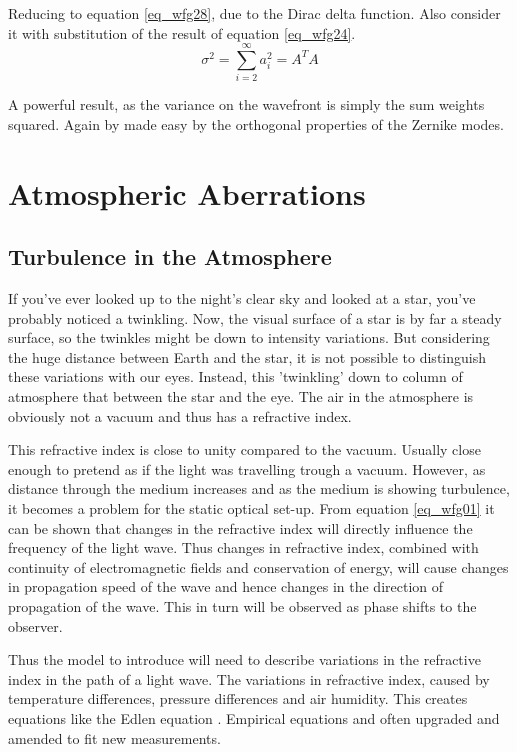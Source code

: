 \documentclass{article}
\begin{document}
Reducing to equation \ref{eq_wfg28}, due to the Dirac delta function. Also consider it with substitution of the result of equation \ref{eq_wfg24}.
\begin{equation}
\sigma^2 = \sum \limits_{i=2}^{\infty} a_i^2 = A^T A
\label{eq_wfg28}
\end{equation}

A powerful result, as the variance on the wavefront is simply the sum weights squared. Again by made easy by the orthogonal properties of the Zernike modes.

\newpage
\section{Atmospheric Aberrations}
\subsection{Turbulence in the Atmosphere}
If you've ever looked up to the night's clear sky and looked at a star, you've probably noticed a twinkling. Now, the visual surface of a star is by far a steady surface, so the twinkles might be down to intensity variations. But considering the huge distance between Earth and the star, it is not possible to distinguish these variations with our eyes. Instead, this 'twinkling' down to column of atmosphere that between the star and the eye. The air in the atmosphere is obviously not a vacuum and thus has a refractive index. 

This refractive index is close to unity compared to the vacuum. Usually close enough to pretend as if the light was travelling trough a vacuum. However, as distance through the medium increases and as the medium is showing turbulence, it becomes a problem for the static optical set-up. From equation \ref{eq_wfg01} it can be shown that changes in the refractive index will directly influence the frequency of the light wave. Thus changes in refractive index, combined with continuity of electromagnetic fields and conservation of energy, will cause changes in propagation speed of the wave and hence changes in the direction of propagation of the wave. This in turn will be observed as phase shifts to the observer.

Thus the model to introduce will need to describe variations in the refractive index in the path of a light wave. The variations in refractive index, caused by temperature differences, pressure differences and air humidity. This creates equations like the Edlen equation \cite{edlen1966}. Empirical equations and often upgraded and amended to fit new measurements. 
\end{document}
